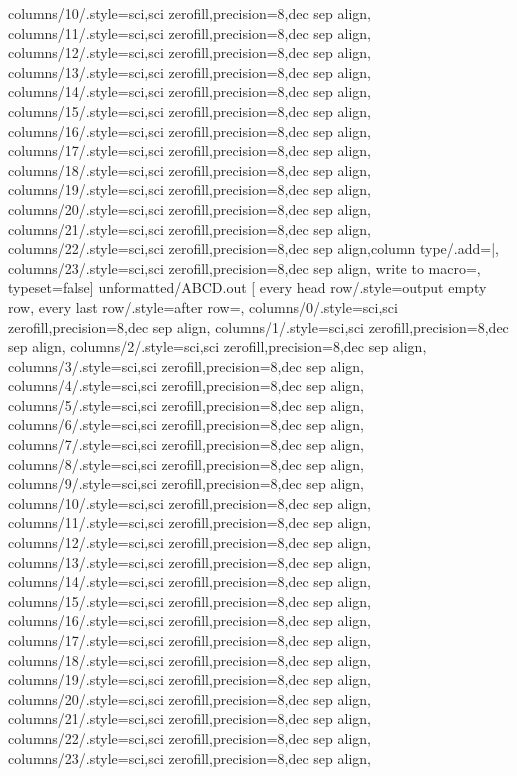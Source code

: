 columns/10/.style={sci,sci zerofill,precision=8,dec sep align},
columns/11/.style={sci,sci zerofill,precision=8,dec sep align},
columns/12/.style={sci,sci zerofill,precision=8,dec sep align},
columns/13/.style={sci,sci zerofill,precision=8,dec sep align},
columns/14/.style={sci,sci zerofill,precision=8,dec sep align},
columns/15/.style={sci,sci zerofill,precision=8,dec sep align},
columns/16/.style={sci,sci zerofill,precision=8,dec sep align},
columns/17/.style={sci,sci zerofill,precision=8,dec sep align},
columns/18/.style={sci,sci zerofill,precision=8,dec sep align},
columns/19/.style={sci,sci zerofill,precision=8,dec sep align},
columns/20/.style={sci,sci zerofill,precision=8,dec sep align},
columns/21/.style={sci,sci zerofill,precision=8,dec sep align},
columns/22/.style={sci,sci zerofill,precision=8,dec sep align,column type/.add={}{|}},
columns/23/.style={sci,sci zerofill,precision=8,dec sep align},
write to macro=\ABCD,
typeset=false]
{unformatted/ABCD.out}
\pgfplotstabletypeset[
every head row/.style={output empty row},
every last row/.style={after row={}},
columns/0/.style={sci,sci zerofill,precision=8,dec sep align},
columns/1/.style={sci,sci zerofill,precision=8,dec sep align},
columns/2/.style={sci,sci zerofill,precision=8,dec sep align},
columns/3/.style={sci,sci zerofill,precision=8,dec sep align},
columns/4/.style={sci,sci zerofill,precision=8,dec sep align},
columns/5/.style={sci,sci zerofill,precision=8,dec sep align},
columns/6/.style={sci,sci zerofill,precision=8,dec sep align},
columns/7/.style={sci,sci zerofill,precision=8,dec sep align},
columns/8/.style={sci,sci zerofill,precision=8,dec sep align},
columns/9/.style={sci,sci zerofill,precision=8,dec sep align},
columns/10/.style={sci,sci zerofill,precision=8,dec sep align},
columns/11/.style={sci,sci zerofill,precision=8,dec sep align},
columns/12/.style={sci,sci zerofill,precision=8,dec sep align},
columns/13/.style={sci,sci zerofill,precision=8,dec sep align},
columns/14/.style={sci,sci zerofill,precision=8,dec sep align},
columns/15/.style={sci,sci zerofill,precision=8,dec sep align},
columns/16/.style={sci,sci zerofill,precision=8,dec sep align},
columns/17/.style={sci,sci zerofill,precision=8,dec sep align},
columns/18/.style={sci,sci zerofill,precision=8,dec sep align},
columns/19/.style={sci,sci zerofill,precision=8,dec sep align},
columns/20/.style={sci,sci zerofill,precision=8,dec sep align},
columns/21/.style={sci,sci zerofill,precision=8,dec sep align},
columns/22/.style={sci,sci zerofill,precision=8,dec sep align},
columns/23/.style={sci,sci zerofill,precision=8,dec sep align},
